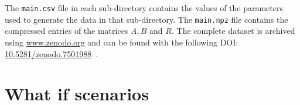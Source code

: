 The \lstinline{main.csv} file in each sub-directory contains the values of the
parameters used to generate the data in that sub-directory.
The \lstinline{main.npz} file contains the compressed entries of the matrices
\(A, B\) and \(R\).
The complete dataset is archived using \url{www.zenodo.org} and can be found
with the following DOI:
\url{10.5281/zenodo.7501988}~\cite{michalis_panayides_2023_7501988}.



\section{What if scenarios}\label{sec:results_what_if}

